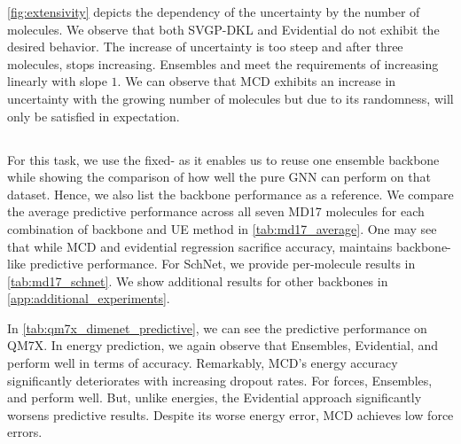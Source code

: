 \autoref{fig:extensivity} depicts the dependency of the uncertainty by the number of molecules.
We observe that both SVGP-DKL and Evidential do not exhibit the desired behavior. The increase of uncertainty is too steep and after three molecules, stops increasing. Ensembles and \oursacro{} meet the requirements of increasing linearly with slope $1$. We can observe that MCD exhibits an increase in uncertainty with the growing number of molecules but due to its randomness, \desfour{} will only be satisfied in expectation. 

\subsection{\desfive{}}
\begin{table}
\caption{MAE of SchNet on MD17 with different UE methods (energies in $\si{\kcal\per\mole}$, forces in $\si{\kcal\per\mole\per\angstrom}$)}\label{tab:md17_schnet}
\resizebox{\columnwidth}{!}{

}
\end{table}
For this task, we use the fixed-\oursacro{} as it enables us to reuse one ensemble backbone while showing the comparison of how well the pure GNN can perform on that dataset. Hence, we also list the backbone performance as a reference. 
We compare the average predictive performance across all seven MD17 molecules for each combination of backbone and UE method in \autoref{tab:md17_average}.
One may see that while MCD and evidential regression sacrifice accuracy, \oursacro{} maintains backbone-like predictive performance. 
For SchNet, we provide per-molecule results in \autoref{tab:md17_schnet}. We show additional results for other backbones in \autoref{app:additional_experiments}.

\begin{table}
    \centering
    \caption{Average metrics over seven molecules of MD17 for different backbones}
    \vspace{0.05in}
    \label{tab:md17_average}
    \resizebox{\columnwidth}{!}{
    
    }
\end{table}

In \autoref{tab:qm7x_dimenet_predictive}, we can see the predictive performance on QM7X.
In energy prediction, we again observe that Ensembles, Evidential, and \oursacro{} perform well in terms of accuracy.
Remarkably, MCD's energy accuracy significantly deteriorates with increasing dropout rates.
For forces, Ensembles, and \oursacro{} perform well. But, unlike energies, the Evidential approach significantly worsens predictive results.
Despite its worse energy error, MCD achieves low force errors.

